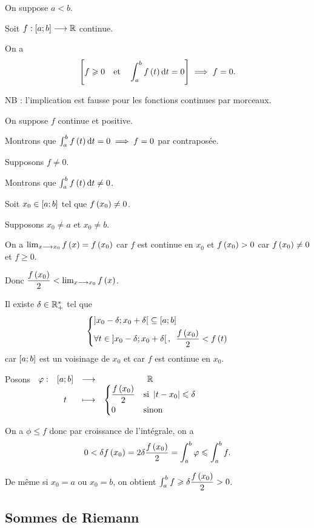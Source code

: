 \begin{prop}
On suppose \(a<b\).

Soit \(f:\left[a;b\right]\longrightarrow\mathbb{R}\) continue.

On a \[\croch{f\geq0\quad\text{et}\quad\int_a^bf\paren{t}\odif{t}=0}\imp f=0.\]

NB : l'implication est fausse pour les fonctions continues par morceaux.
\end{prop}

\begin{dem}
On suppose \(f\) continue et positive.

Montrons que \(\int_a^bf\paren{t}\odif{t}=0\imp f=0\) par contraposée.

Supposons \(f\not=0\).

Montrons que \(\int_a^bf\paren{t}\odif{t}\not=0\).

Soit \(x_0\in\left[a;b\right]\) tel que \(f\left(x_0\right)\not=0\).

Supposons \(x_0\not=a\) et \(x_0\not=b\).

On a \(\lim_{x\longrightarrow x_0}f\left(x\right)=f\left(x_0\right)\) car \(f\) est continue en \(x_0\) et \(f\left(x_0\right)>0\) car \(f\left(x_0\right)\not=0\) et \(f\geq0\).

Donc \(\dfrac{f\left(x_0\right)}{2}<\lim_{x\longrightarrow x_0}f\left(x\right)\).

Il existe \(\delta\in\mathbb{R}_+^*\) tel que \[\begin{dcases}\intervee{x_0-\delta}{x_0+\delta}\subset\intervii{a}{b} \\ \quantifs{\forall t\in\intervee{x_0-\delta}{x_0+\delta}}\dfrac{f\paren{x_0}}{2}<f\paren{t}\end{dcases}\] car \(\left[a;b\right]\) est un voisinage de \(x_0\) et car \(f\) est continue en \(x_0\).

Posons \(\begin{array}[t]{cccc}\varphi : & \left[a;b\right] & \longrightarrow & \mathbb{R} \\ & t & \longmapsto & \begin{dcases}\dfrac{f\left(x_0\right)}{2} &\text{si }\left\lvert t-x_0\right\rvert\leqslant\delta \\ 0 &\text{sinon}\end{dcases}\end{array}\)

On a \(\phi\leq f\) donc par croissance de l'intégrale, on a \[0<\delta f\left(x_0\right)=2\delta\dfrac{f\left(x_0\right)}{2}=\int_a^b\varphi\leqslant\int_a^bf.\]

De même si \(x_0=a\) ou \(x_0=b\), on obtient \(\int_a^bf\geqslant\delta\dfrac{f\left(x_0\right)}{2}>0\).
\end{dem}

\subsection{Sommes de Riemann}

